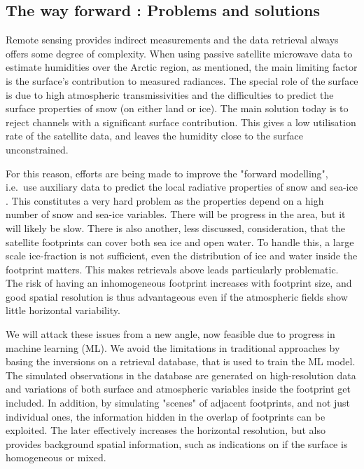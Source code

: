 \documentclass[12pt,oneside,a4paper]{article}
\begin{document}
\subsection{The way forward : Problems and solutions }


Remote sensing provides indirect measurements and the data retrieval always offers some degree of complexity. When using passive satellite microwave data to estimate humidities over the Arctic region, as mentioned, the main limiting factor is the surface's contribution to measured radiances. The special role of the surface is due to high atmospheric transmissivities and the difficulties to predict the surface properties of snow (on either land or ice).
The main solution today is to reject channels with a significant surface
contribution. This gives a low utilisation rate of the satellite data, and
leaves the humidity close to the surface unconstrained.

For this reason, efforts are being made to improve the "forward modelling",
i.e.\ use auxiliary data to predict the local radiative properties of snow and
sea-ice \citep[e.g.][]{tonboe:2010:thesi}. This constitutes a very hard problem
as the properties depend on a high number of snow and sea-ice
variables. There will be progress in the area, but it will likely be slow.
There is also another, less discussed, consideration, that the satellite
footprints can cover both sea ice and open water. To handle this, a large scale
ice-fraction is not sufficient, even the distribution of ice and water inside
the footprint matters. This makes retrievals above leads particularly
problematic. The risk of having an inhomogeneous footprint increases with
footprint size, and good spatial resolution is thus advantageous even if the atmospheric fields show little horizontal variability.



We will attack these issues from a new angle, now feasible due to progress in
machine learning (ML). We avoid the limitations in traditional approaches by
basing the inversions on a retrieval database, that is used to train the ML
model. The simulated observations in the database are generated on
high-resolution data and variations of both surface and atmospheric variables
inside the footprint get included. In addition, by simulating "scenes" of
adjacent footprints, and not just individual ones, the information hidden in the overlap of footprints can be exploited. The later effectively increases the horizontal resolution, but also provides background spatial information, such as indications on if the surface is homogeneous or mixed.
\end{document}
